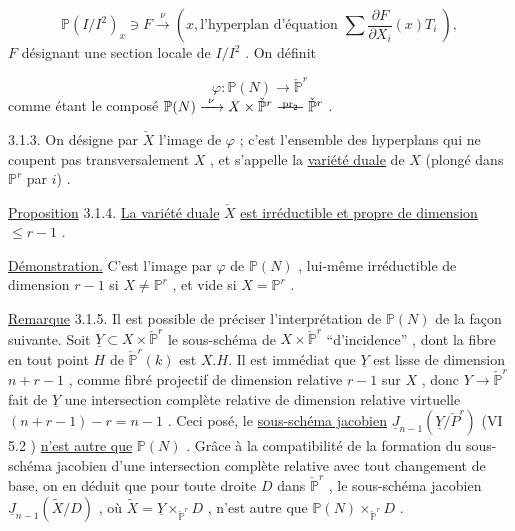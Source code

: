 \begin{equation}\tag{3.1.1}
\mathbb{P}(I/I^2)_x \ni F \xrightarrow{\ \nu\ } (x, \text{l'hyperplan d'équation } \sum \frac{\partial F}{\partial X_i}(x)T_i\ ),
\end{equation}
$F$  désignant une section locale de  $I/I^2$  . On définit

\begin{equation}\tag{3.1.2}
\varphi : \mathbb{P}(N) \longrightarrow \check{\mathbb{P}}^r
\end{equation}
comme étant le composé  $\mathbb{P}(N) \xrightarrow{\ \nu\ } X \times \check{\mathbb{P}}^r \stackrel{\mathrm{pr}_2}{\relbar\joinrel\relbar\joinrel\relbar} \check{\mathbb{P}}^r$ .



3.1.3. On désigne par $\check{X}$ l'image de $\varphi$ ; c'est l'ensemble des hyperplans qui ne coupent pas transversalement $X$ , et s'appelle la \underline{variété duale} de $X$ (plongé dans $\mathbb{P}^r$ par $i$) .

\underline{Proposition} 3.1.4. \underline{La variété duale} $\check{X}$ \underline{est irréductible et propre de dimension} $\leq r-1$ .

\underline{Démonstration.} C'est l'image par $\varphi$ de $\mathbb{P}(N)$ , lui-même irréductible de dimension $r-1$ si $X \neq \mathbb{P}^r$ , et vide si $X = \mathbb{P}^r$ .

\underline{Remarque} 3.1.5. Il est possible de préciser l'interprétation de $\mathbb{P}(N)$ de la façon suivante. Soit $\underline{Y} \subset X \times \check{\mathbb{P}}^r$ le sous-schéma de $X \times \check{\mathbb{P}}^r$ ``d'incidence'' , dont la fibre en tout point $H$ de $\check{\mathbb{P}}^r(k)$ est $X.H$. Il est immédiat que $\underline{Y}$ est lisse de dimension $n+r-1$ , comme fibré projectif de dimension relative $r-1$ sur $X$ , donc $Y \longrightarrow \check{\mathbb{P}}^r$ fait de $\underline{Y}$ une intersection complète relative de dimension relative virtuelle $(n+r-1)-r = n-1$ . Ceci posé, le \underline{sous-schéma jacobien} $\underline{J}_{n-1}(\underline{Y}/\check{P}^r)$ (VI 5.2 ) \underline{n'est autre que} $\mathbb{P}(N)$ . Grâce à la compatibilité de la formation du sous-schéma jacobien d'une intersection complète relative avec tout changement de base, on en déduit que pour toute droite $D$ dans $\check{\mathbb{P}}^r$ , le sous-schéma jacobien $\underline{J}_{n-1}(\tilde{X}/D)$ , où $\tilde{X} = \underline{Y} \times_{\check{\mathbb{P}}^r} D$ , n'est autre que $\mathbb{P}(N) \times_{\check{\mathbb{P}}^r} D$ .


